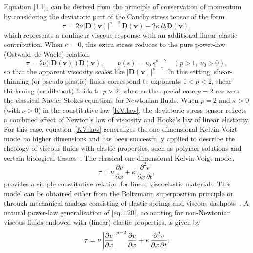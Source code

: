 \documentclass[12pt,reqno]{amsart}
\numberwithin{equation}{section}
\let\originalleft\left
\let\originalright\right
\renewcommand{\left}{\mathopen{}\mathclose\bgroup\originalleft}
\renewcommand{\right}{\aftergroup\egroup\originalright}
\theoremstyle{definition}
\def\vv{\boldsymbol{v}}
\def\bfD{\mathbf{D}}
\begin{document}
Equation \eqref{1.1}$_1$ can be derived from the principle of conservation of momentum by considering the deviatoric part of the Cauchy stress tensor of the form
\begin{equation}\label{KV:law}
\boldsymbol{\tau}
  = 2\nu\,|\bfD(\vv)|^{p-2}\,\bfD(\vv)
    + 2\kappa\,\partial_t\bfD(\vv),
\end{equation}
which represents a nonlinear viscous response with an additional linear elastic contribution.
When $\kappa=0$, this extra stress reduces to the pure power-law ({Ostwald--de Waele}) relation
\begin{equation}\label{dev:str:OdW}
\boldsymbol{\tau}
  = 2\nu\bigl(|\bfD(\vv)|\bigr)\,\bfD(\vv),
\qquad
\nu(s) = \nu_0\, s^{p-2}
\quad (p>1,\ \nu_0>0),
\end{equation}
so that the apparent viscosity scales like $|\bfD(\vv)|^{p-2}$.
In this setting, shear-thinning (or pseudo-plastic) fluids correspond to exponents $1<p<2$, shear-thickening (or dilatant) fluids to $p>2$, whereas the special case $p=2$ recovers the classical Navier-Stokes equations for Newtonian fluids.
When $p=2$ and $\kappa>0$ (with $\nu>0$) in the constitutive law \eqref{KV:law},
the deviatoric stress tensor reflects a combined effect of
Newton's law of viscosity and Hooke's law of linear elasticity.
For this case, equation~\eqref{KV:law} generalizes the one-dimensional Kelvin-Voigt model to higher dimensions and has been successfully applied to describe the rheology of viscous fluids with elastic properties, such as polymer solutions and certain biological tissues~\cite{Pav-1971,CSS:2002}.
The classical one-dimensional Kelvin-Voigt model,
\begin{equation}\label{eq.1.20}
\tau
  = \nu\,\frac{\partial v}{\partial x}
    + \kappa\,\frac{\partial^2 v}{\partial x \,\partial t},
\end{equation}
provides a simple constitutive relation for linear viscoelastic materials.
This model can be obtained either from the Boltzmann superposition principle or through mechanical analogs consisting of elastic springs and viscous dashpots~\cite{Barnes:2000}.
A natural power-law generalization of \eqref{eq.1.20}, accounting for non-Newtonian viscous fluids endowed with (linear) elastic properties, is given by
\begin{equation}\label{Plaw:1d:KV}
\tau
  = \nu\,\left| \frac{\partial v}{\partial x} \right|^{p-2}\,\frac{\partial v}{\partial x}
    + \kappa\,\frac{\partial^2 v}{\partial x \,\partial t}.
\end{equation}
\end{document}

